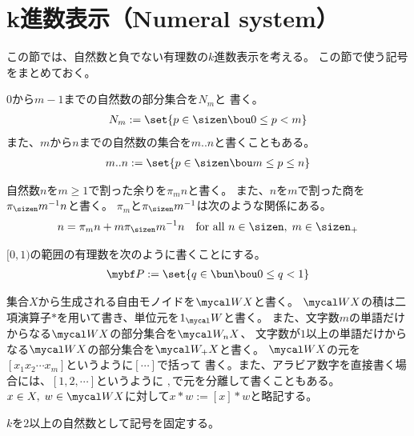 \section{k進数表示（Numeral system）}\label{s1:k進数表示} %
	この節では、自然数と負でない有理数の$k$進数表示を考える。
	この節で使う記号をまとめておく。
	\begin{description}\setlength{\itemsep}{-1mm} %
		\item[自然数の部分集合] $0$から$m-1$までの自然数の部分集合を$N_m$と
		書く。
		\begin{equation*}\begin{split}
			N_m := \set{p\in\sizen\bou 0\le p< m}
		\end{split}\end{equation*}
		また、$m$から$n$までの自然数の集合を$m..n$と書くこともある。
		\begin{equation*}\begin{split}
			m..n := \set{p\in\sizen\bou m\le p\le n}
		\end{split}\end{equation*}
		\item[割り算の余り] 自然数$n$を$m\ge1$で割った余りを$\pi_mn$と書く。
		また、$n$を$m$で割った商を$\q{m}n$と書く。
		$\pi_m$と$\q{m}$は次のような関係にある。
		\begin{equation*}\begin{split}
			n = \pi_mn + m\q{m}n
			\quad\text{for all }n\in\sizen,\;m\in\sizen_+
		\end{split}\end{equation*}
		\item[有理数] $[0,1)$の範囲の有理数を次のように書くことにする。
		\begin{equation*}\begin{split}
			\bunsub := \set{q\in\bun\bou 0\le q< 1}
		\end{split}\end{equation*}
		\item[自由モノイド] 集合$X$から生成される自由モノイドを$\Word X$と書く。
		$\Word X$の積は二項演算子$*$を用いて書き、単位元を$1_\Word$と書く。
		また、文字数$m$の単語だけからなる$\Word X$の部分集合を$\Word_nX$、
		文字数が$1$以上の単語だけからなる$\Word X$の部分集合を$\Word_+X$と書く。
		$\Word X$の元を$[x_1x_2\cdots x_m]$というように$[\cdots]$で括って
		書く。また、アラビア数字を直接書く場合には、$[1,2,\cdots]$というように
		$,$で元を分離して書くこともある。
		$x\in X,\;w\in\Word X$に対して$x*w:=[x]*w$と略記する。
		\item[便宜] $k$を$2$以上の自然数として記号を固定する。
	\end{description} %

